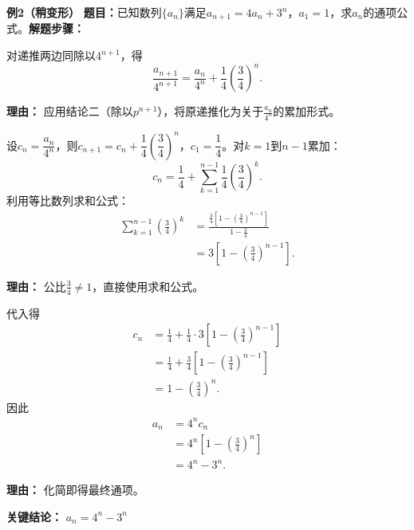 \begin{examplebox}
	\medskip
	\textbf{\textcolor{CExample}{例2（稍变形）}}
	\textbf{\textcolor{CExample}{题目：}}已知数列$\{a_n\}$满足$a_{n+1}=4a_n+3^n$，$a_1=1$，求$a_n$的通项公式。\textbf{\textcolor{CExample}{解题步骤：}}
	\begin{description}[style=nextline, leftmargin=2.8em, labelsep=0.5em, itemsep=0.45em]
		\item[\textbf{第一步（同除构造）：}]
			对递推两边同除以$4^{n+1}$，得
			\[
				\frac{a_{n+1}}{4^{n+1}} = \frac{a_n}{4^n} + \frac{1}{4}\left(\frac{3}{4}\right)^n.
			\]
			\par\textbf{理由：} 应用结论二（除以$p^{n+1}$），将原递推化为关于$\frac{a_n}{4^n}$的累加形式。
		\item[\textbf{第二步（累加求和）：}]
			设$c_n=\dfrac{a_n}{4^n}$，则$c_{n+1}=c_n+\dfrac{1}{4}\left(\dfrac{3}{4}\right)^n$，$c_1=\dfrac{1}{4}$。对$k=1$到$n-1$累加：
			\[
				c_n = \frac{1}{4} + \sum_{k=1}^{n-1}\frac{1}{4}\left(\frac{3}{4}\right)^k.
			\]
			利用等比数列求和公式：
			\[
				\begin{aligned}
					\sum_{k=1}^{n-1}\left(\frac{3}{4}\right)^k &= \frac{\frac{3}{4}\left[1-\left(\frac{3}{4}\right)^{n-1}\right]}{1-\frac{3}{4}} \\ &= 3\left[1-\left(\frac{3}{4}\right)^{n-1}\right].
			\end{aligned}
			\]
			\par\textbf{理由：} 公比$\frac{3}{4}\neq1$，直接使用求和公式。
		\item[\textbf{第三步（化简回代）：}]
			代入得
			\[
				\begin{aligned}
					c_n &= \frac{1}{4} + \frac{1}{4}\cdot 3\left[1-\left(\frac{3}{4}\right)^{n-1}\right] \\ &= \frac{1}{4} + \frac{3}{4}\left[1-\left(\frac{3}{4}\right)^{n-1}\right] \\ &= 1 - \left(\frac{3}{4}\right)^n.
			\end{aligned}
			\]
			因此
			\[
				\begin{aligned}
					a_n &= 4^n c_n \\ &= 4^n\left[1-\left(\frac{3}{4}\right)^n\right] \\ &= 4^n - 3^n.
			\end{aligned}
			\]
			\par\textbf{理由：} 化简即得最终通项。
	\end{description}
	\textbf{\textcolor{CExample}{关键结论：}}
	\textbf{$a_n = 4^n - 3^n$}


\end{examplebox}
